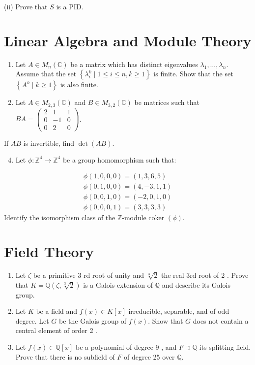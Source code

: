 \documentclass[10pt]{article}
\begin{document}
(ii) Prove that $S$ is a PID.

\section{Linear Algebra and Module Theory}
\begin{enumerate}
  \item Let $A \in M_{n}(\mathbb{C})$ be a matrix which has distinct eigenvalues $\lambda_{1}, \ldots, \lambda_{n}$. Assume that the set $\left\{\lambda_{i}^{k} \mid 1 \leq i \leq n, k \geq 1\right\}$ is finite. Show that the set $\left\{A^{k} \mid k \geq 1\right\}$ is also finite.

  \item Let $A \in M_{2,3}(\mathbb{C})$ and $B \in M_{3,2}(\mathbb{C})$ be matrices such that $B A=\left(\begin{array}{ccc}2 & 1 & 1 \\ 0 & -1 & 0 \\ 0 & 2 & 0\end{array}\right)$.

\end{enumerate}
If $A B$ is invertible, find $\operatorname{det}(A B)$.

\begin{enumerate}
  \setcounter{enumi}{3}
  \item Let $\phi: \mathbb{Z}^{4} \rightarrow \mathbb{Z}^{4}$ be a group homomorphism such that:
\end{enumerate}
$$
\begin{gathered}
\phi(1,0,0,0)=(1,3,6,5) \\
\phi(0,1,0,0)=(4,-3,1,1) \\
\phi(0,0,1,0)=(-2,0,1,0) \\
\phi(0,0,0,1)=(3,3,3,3)
\end{gathered}
$$
Identify the isomorphism class of the $\mathbb{Z}$-module coker $(\phi)$.

\section{Field Theory}
\begin{enumerate}
  \item Let $\zeta$ be a primitive 3 rd root of unity and $\sqrt[3]{2}$ the real 3rd root of 2 . Prove that $K=\mathbb{Q}(\zeta, \sqrt[3]{2})$ is a Galois extension of $\mathbb{Q}$ and describe its Galois group.

  \item Let $K$ be a field and $f(x) \in K[x]$ irreducible, separable, and of odd degree. Let $G$ be the Galois group of $f(x)$. Show that $G$ does not contain a central element of order 2 .

  \item Let $f(x) \in \mathbb{Q}[x]$ be a polynomial of degree 9 , and $F \supset \mathbb{Q}$ its splitting field. Prove that there is no subfield of $F$ of degree 25 over $\mathbb{Q}$.

\end{enumerate}
\end{document}
